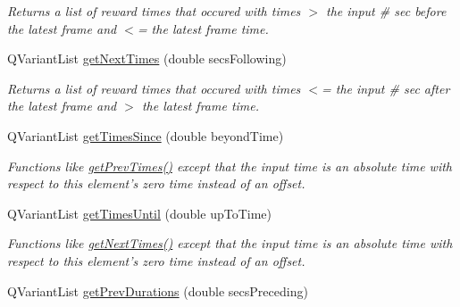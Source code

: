\begin{DoxyCompactItemize}
\begin{DoxyCompactList}\small\item\em Returns a list of reward times that occured with times $>$ the input \# sec before the latest frame and $<$= the latest frame time. \end{DoxyCompactList}\item 
Q\-Variant\-List \hyperlink{class_picto_1_1_analysis_reward_data_a138d81af6e9603ff8c2efe10778e5f26}{get\-Next\-Times} (double secs\-Following)
\begin{DoxyCompactList}\small\item\em Returns a list of reward times that occured with times $<$= the input \# sec after the latest frame and $>$ the latest frame time. \end{DoxyCompactList}\item 
\hypertarget{class_picto_1_1_analysis_reward_data_a740d7406202c8fbeb13c90d9ace280cd}{Q\-Variant\-List \hyperlink{class_picto_1_1_analysis_reward_data_a740d7406202c8fbeb13c90d9ace280cd}{get\-Times\-Since} (double beyond\-Time)}\label{class_picto_1_1_analysis_reward_data_a740d7406202c8fbeb13c90d9ace280cd}

\begin{DoxyCompactList}\small\item\em Functions like \hyperlink{class_picto_1_1_analysis_reward_data_a8bb9a53f0c833ba0af65c3c64e478c84}{get\-Prev\-Times()} except that the input time is an absolute time with respect to this element's zero time instead of an offset. \end{DoxyCompactList}\item 
\hypertarget{class_picto_1_1_analysis_reward_data_a6b034594fd9b6d3ac763ae3ecf993bb4}{Q\-Variant\-List \hyperlink{class_picto_1_1_analysis_reward_data_a6b034594fd9b6d3ac763ae3ecf993bb4}{get\-Times\-Until} (double up\-To\-Time)}\label{class_picto_1_1_analysis_reward_data_a6b034594fd9b6d3ac763ae3ecf993bb4}

\begin{DoxyCompactList}\small\item\em Functions like \hyperlink{class_picto_1_1_analysis_reward_data_a138d81af6e9603ff8c2efe10778e5f26}{get\-Next\-Times()} except that the input time is an absolute time with respect to this element's zero time instead of an offset. \end{DoxyCompactList}\item 
\hypertarget{class_picto_1_1_analysis_reward_data_a5077cf16806502afc4f14b8bded10f1f}{Q\-Variant\-List \hyperlink{class_picto_1_1_analysis_reward_data_a5077cf16806502afc4f14b8bded10f1f}{get\-Prev\-Durations} (double secs\-Preceding)}\label{class_picto_1_1_analysis_reward_data_a5077cf16806502afc4f14b8bded10f1f}


\end{DoxyCompactItemize}
